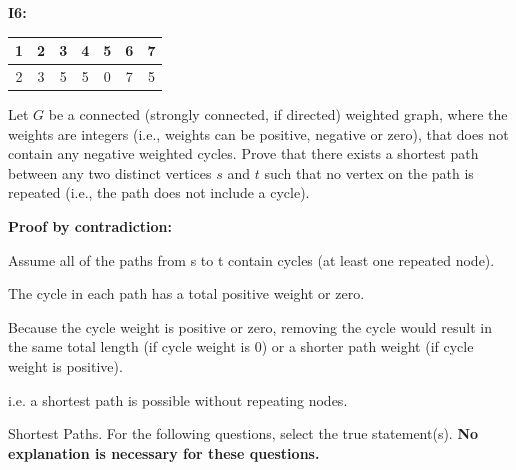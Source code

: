 \documentclass[12pt]{exam}
\newcommand{\stars}[1]{%
    \foreach \n in {1,...,#1}{%
        $\filledstar$%
    }%
}
\begin{document}
\begin{questions}
    {{\bf I6:}
    \par{
        \begin{tabular}{|c|c|c|c|c|c|c|}
            \multicolumn{1}{c}{1} & \multicolumn{1}{c}{2} &
            \multicolumn{1}{c}{3} & \multicolumn{1}{c}{4} &
            \multicolumn{1}{c}{5} & \multicolumn{1}{c}{6} &
            \multicolumn{1}{c}{7}
            \\ \hline
            2                     & 3                     & 5 & 5 & 0 & 7 & 5 \\
            \hline
        \end{tabular}}}

    \clearpage


    \question[25] [W6, \stars{4}] Let $G$ be a connected (strongly connected, if directed) weighted graph, where the weights are integers (i.e., weights can be positive, negative or zero), that does not contain any negative weighted cycles. Prove that there exists a shortest path between any two distinct vertices $s$ and $t$ such that no vertex on the path is repeated (i.e., the path does not include a cycle).

    \textbf{Proof by contradiction:}

    Assume all of the paths from s to t contain cycles (at least one repeated node).

    The cycle in each path has a total positive weight or zero.

    Because the cycle weight is positive or zero, removing the cycle would result in the same total length (if cycle weight is 0) or a shorter path weight (if cycle weight is positive).

    i.e. a shortest path is possible without repeating nodes.

    \clearpage

    \question[20] [W6, \stars{2}] Shortest Paths.
    For the following questions, select the true statement(s). \textbf{No explanation is necessary for these questions.}

\end{questions}
\end{document}
